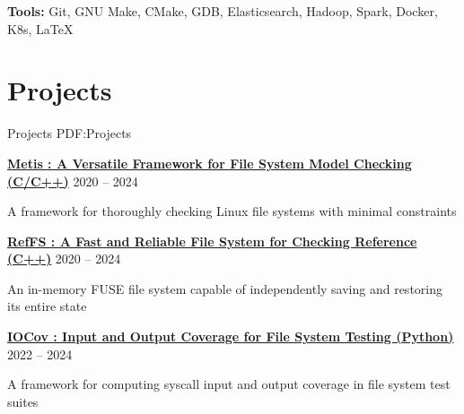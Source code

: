 \documentclass[a4paper,10pt,oneside]{article}
\begin{document}
\begin{body}
\BulletItem
\textbf{Tools:} Git, GNU Make, CMake, GDB, Elasticsearch, Hadoop, Spark, Docker, K8s, {\LaTeX}


\GapNoBreak

\section
{Projects}
{Projects}
{PDF:Projects}

\href{https://github.com/sbu-fsl/Metis}
{\textbf{Metis : A Versatile Framework for File System Model Checking (C/C++)}}
\hfill
2020 -- 
2024

\BulletItem
A framework for thoroughly checking Linux file systems with minimal constraints

\href{https://github.com/sbu-fsl/RefFS}
{\textbf{RefFS : A Fast and Reliable File System for Checking Reference (C++)}}
\hfill
2020 -- 
2024

\BulletItem
An in-memory FUSE file system capable of independently saving and restoring its entire state

\href{https://github.com/sbu-fsl/IOCov}
{\textbf{IOCov : Input and Output Coverage for File System Testing (Python)}}
\hfill
2022 -- 
2024

\BulletItem
A framework for computing syscall input and output coverage in file system test suites











\end{body}
\end{document}
